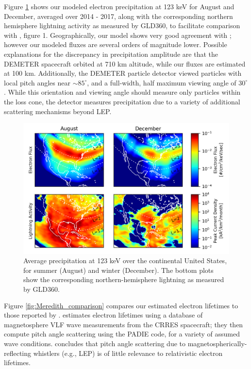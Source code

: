 Figure \ref{fig:gemelos_comparison} shows our modeled electron precipitation at 123 keV for August and December, averaged over 2014 - 2017, along with the corresponding northern hemisphere lightning activity as measured by GLD360, to facilitate comparison with \cite{Gemelos2009}, figure 1. Geographically, our model shows very good agreement with \citeauthor{Gemelos2009}; however our modeled fluxes are several orders of magnitude lower. Possible explanations for the discrepancy in precipitation amplitude are that the DEMETER spacecraft orbited at 710 km altitude, while our fluxes are estimated at 100 km. Additionally, the DEMETER particle detector viewed particles with local pitch angles near $\sim 85^\circ$, and a full-width, half maximum viewing angle of $30^\circ$. While this orientation and viewing angle should measure only particles within the loss cone, the detector measures precipitation due to a variety of additional scattering mechanisms beyond LEP. 

\begin{figure}[]
\begin{center}
\includegraphics{figures/Gemelos_comparison.png}
\caption[Precipitation at 123 keV over the continental United States, for summer and winter]{Average precipitation at 123 keV over the continental United States, for summer (August) and winter (December). The bottom plots show the corresponding northern-hemisphere lightning as measured by GLD360.}
\label{fig:gemelos_comparison}
\end{center}
\end{figure}

Figure \ref{fig:Meredith_comparison} compares our estimated electron lifetimes to those reported by \cite{Meredith2007}. \citeauthor{Meredith2007} estimates electron lifetimes using a database of magnetosphere VLF wave measurements from the CRRES spacecraft; they then compute pitch angle scattering using the PADIE code, for a variety of assumed wave conditions. \citeauthor{Meredith2007} concludes that pitch angle scattering due to magnetospherically-reflecting whistlers (e.g., LEP) is of little relevance to relativistic electron lifetimes.


